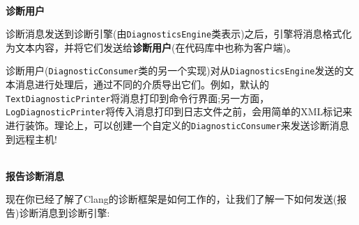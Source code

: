 \hspace*{\fill} \\ %
\noindent
\textbf{诊断用户}

诊断消息发送到诊断引擎(由\texttt{DiagnosticsEngine}类表示)之后，引擎将消息格式化为文本内容，并将它们发送给\textbf{诊断用户}(在代码库中也称为客户端)。

诊断用户(\texttt{DiagnosticConsumer}类的另一个实现)对从\texttt{DiagnosticsEngine}发送的文本消息进行处理后，通过不同的介质导出它们。例如，默认的\texttt{TextDiagnosticPrinter}将消息打印到命令行界面;另一方面，\texttt{LogDiagnosticPrinter}将传入消息打印到日志文件之前，会用简单的XML标记来进行装饰。理论上，可以创建一个自定义的\texttt{DiagnosticConsumer}来发送诊断消息到远程主机!

\hspace*{\fill} \\ %
\noindent
\textbf{报告诊断消息}

现在你已经了解了Clang的诊断框架是如何工作的，让我们了解一下如何发送(报告)诊断消息到诊断引擎:

